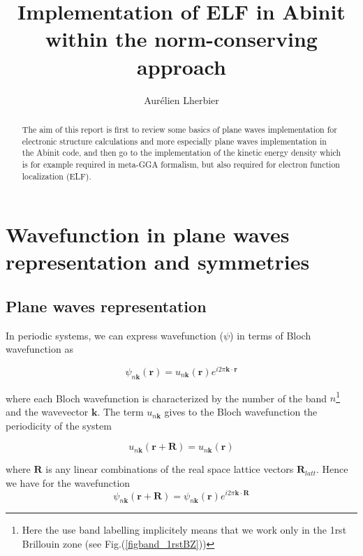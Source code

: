\documentclass[a4paper,12pt]{report}
\title{Implementation of ELF in Abinit within the norm-conserving approach}
\author{Aur\'{e}lien Lherbier}
\begin{document}
\maketitle

\begin{abstract}
The aim of this report is first to review some basics of plane waves implementation for electronic structure calculations and more especially plane waves implementation in the Abinit code, and then go to the implementation of the kinetic energy density which is for example required in meta-GGA formalism, but also required for electron function localization (ELF).
\end{abstract}

\chapter{Wavefunction in plane waves representation and symmetries}
\label{chapter1}

\section{Plane waves representation}
\label{section1_1}

In periodic systems, we can express wavefunction ($\psi$) in terms of Bloch wavefunction as

\begin{equation}
\psi_{n\mathbf{k}}(\mathbf{r}) = u_{n\mathbf{k}}(\mathbf{r}) e^{i2\pi \mathbf{k}\cdotp\mathbf{r}}
\end{equation}

where each Bloch wavefunction is characterized by the number of the band $n$\footnote{Here the use band labelling implicitely means that we work only in the 1rst Brillouin zone (see Fig.(\ref{figband_1rstBZ}))} and the wavevector $\mathbf{k}$. The term $u_{n\mathbf{k}}$ gives to the Bloch wavefunction the periodicity of the system

\begin{equation}
u_{n\mathbf{k}}(\mathbf{r}+\mathbf{R}) = u_{n\mathbf{k}}(\mathbf{r})
\end{equation}

where $\mathbf{R}$ is any linear combinations of the real space lattice vectors $\mathbf{R}_{latt}$. Hence we have for the wavefunction
\begin{equation}
\psi_{n\mathbf{k}}(\mathbf{r}+\mathbf{R}) = \psi_{n\mathbf{k}}(\mathbf{r})e^{i2\pi\mathbf{k}\cdotp\mathbf{R}} \label{wf_r+R}
\end{equation}
\end{document}
